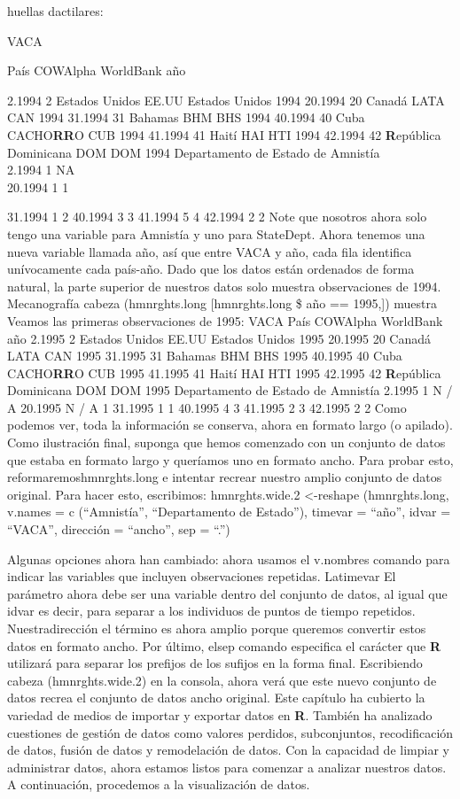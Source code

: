\documentclass[
]{book}
\begin{document}
huellas dactilares:

VACA

País COWAlpha WorldBank año

2.1994 2 Estados Unidos EE.UU Estados Unidos 1994
20.1994 20 Canadá LATA CAN 1994
31.1994 31 Bahamas BHM BHS 1994
40.1994 40 Cuba\\
CACHO\textbf{RR}O CUB 1994
41.1994 41 Haití HAI HTI 1994
42.1994 42 \textbf{R}epública Dominicana DOM DOM 1994
Departamento de Estado de Amnistía\\
2.1994 1 NA\\
20.1994 1 1

31.1994 1 2
40.1994 3 3
41.1994 5 4
42.1994 2 2
Note que nosotros ahora solo tengo una variable para Amnistía y uno para StateDept. Ahora tenemos una nueva variable llamada año, así que entre VACA
y año, cada fila identifica unívocamente cada país-año. Dado que los datos están ordenados de forma natural, la parte superior de nuestros datos solo muestra observaciones de 1994. Mecanografía cabeza (hmnrghts.long {[}hmnrghts.long \$ año == 1995,{]}) muestra
Veamos las primeras observaciones de 1995:
VACA País COWAlpha WorldBank año
2.1995 2 Estados Unidos EE.UU Estados Unidos 1995
20.1995 20 Canadá LATA CAN 1995
31.1995 31 Bahamas BHM BHS 1995
40.1995 40 Cuba\\
CACHO\textbf{RR}O CUB 1995
41.1995 41 Haití HAI HTI 1995
42.1995 42 \textbf{R}epública Dominicana DOM DOM 1995
Departamento de Estado de Amnistía
2.1995 1 N / A
20.1995 N / A 1
31.1995 1 1
40.1995 4 3
41.1995 2 3
42.1995 2 2
Como podemos ver, toda la información se conserva, ahora en formato largo (o apilado).
Como ilustración final, suponga que hemos comenzado con un conjunto de datos que estaba en formato largo y queríamos uno en formato ancho. Para probar esto, reformaremoshmnrghts.long e intentar recrear nuestro amplio conjunto de datos original. Para hacer esto, escribimos:
hmnrghts.wide.2 \textless-reshape (hmnrghts.long,
v.names = c (``Amnistía'', ``Departamento de Estado''), timevar = ``año'', idvar
= ``VACA'', dirección = ``ancho'', sep = ``.'')

Algunas opciones ahora han cambiado: ahora usamos el v.nombres comando para indicar las variables que incluyen observaciones repetidas. Latimevar El parámetro ahora debe ser una variable dentro del conjunto de datos, al igual que idvar es decir, para separar a los individuos de puntos de tiempo repetidos. Nuestradirección el término es ahora amplio porque queremos convertir estos datos en formato ancho. Por último, elsep comando especifica el carácter que \textbf{R} utilizará para separar los prefijos de los sufijos en la forma final. Escribiendo cabeza (hmnrghts.wide.2) en la consola, ahora verá que este nuevo conjunto de datos recrea el conjunto de datos ancho original.
Este capítulo ha cubierto la variedad de medios de importar y exportar datos en
\textbf{R}. También ha analizado cuestiones de gestión de datos como valores perdidos, subconjuntos, recodificación de datos, fusión de datos y remodelación de datos. Con la capacidad de limpiar y administrar datos, ahora estamos listos para comenzar a analizar nuestros datos. A continuación, procedemos a la visualización de datos.
\end{document}
